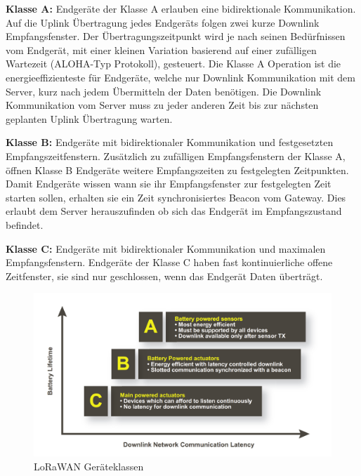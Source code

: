 \textbf{Klasse A:} Endgeräte der Klasse A erlauben eine bidirektionale Kommunikation. Auf die Uplink Übertragung jedes Endgeräts folgen zwei kurze Downlink Empfangsfenster. Der Übertragungszeitpunkt wird je nach seinen Bedürfnissen vom Endgerät, mit einer kleinen Variation basierend auf einer zufälligen Wartezeit (ALOHA-Typ Protokoll), gesteuert. Die Klasse A Operation ist die energieeffizienteste für Endgeräte, welche nur Downlink Kommunikation mit dem Server, kurz nach jedem Übermitteln der Daten benötigen. Die Downlink Kommunikation vom Server muss zu jeder anderen Zeit bis zur nächsten geplanten Uplink Übertragung warten.

\textbf{Klasse B:} Endgeräte mit bidirektionaler Kommunikation und festgesetzten Empfangszeitfenstern. Zusätzlich zu zufälligen Empfangsfenstern der Klasse A, öffnen Klasse B Endgeräte weitere Empfangszeiten zu festgelegten Zeitpunkten. Damit Endgeräte wissen wann sie ihr Empfangsfenster zur festgelegten Zeit starten sollen, erhalten sie ein Zeit synchronisiertes Beacon vom Gateway. Dies erlaubt dem Server herauszufinden ob sich das Endgerät im Empfangszustand befindet.

\textbf{Klasse C:} Endgeräte mit bidirektionaler Kommunikation und maximalen Empfangsfenstern. Endgeräte der Klasse C haben fast kontinuierliche offene Zeitfenster, sie sind nur geschlossen, wenn das Endgerät Daten überträgt.

\begin{figure}[H]
     \centering
        \includegraphics[width=1.0\textwidth]{pictures/device-classes.png}
    \caption{LoRaWAN Geräteklassen}
    \label{fig:LoRaWAN Geräteklassen}
\end{figure}


